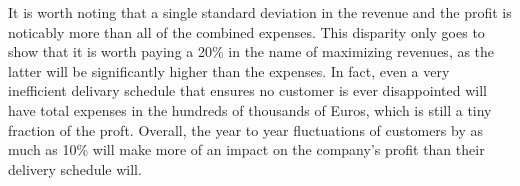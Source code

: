 \begin{paper}
It is worth noting that a single standard deviation in the revenue and the profit is noticably more than all of the combined expenses.
This disparity only goes to show that it is worth paying a 20\% in the name of maximizing revenues, as the latter will be significantly higher than the expenses.
In fact, even a very inefficient delivary schedule that ensures no customer is ever disappointed will have total expenses in the hundreds of thousands of Euros, which is still a tiny fraction of the proft.
Overall, the year to year fluctuations of customers by as much as 10\% will make more of an impact on the company's profit than their delivery schedule will.

\end{paper}

